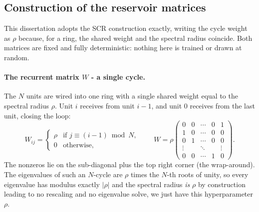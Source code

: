 \subsection{Construction of the reservoir matrices}
\label{sec:bg-scr-construction}

This dissertation adopts the SCR construction exactly, writing the cycle
weight as $\rho$ because, for a ring, the shared weight and the spectral
radius coincide. Both matrices are fixed and fully deterministic: nothing here
is trained or drawn at random.

\paragraph{The recurrent matrix $W$ -  a single cycle.}
The $N$ units are wired into one ring with a single shared weight equal to the spectral radius $\rho$. Unit $i$ receives from unit $i-1$, and unit $0$ receives from the last unit, closing the loop:
\begin{equation}
  W_{ij} =
  \begin{cases}
    \rho & \text{if } j \equiv (i-1) \bmod N,\\
    0    & \text{otherwise,}
  \end{cases}
  \qquad
  W = \rho
  \begin{pmatrix}
    0 & 0 & \cdots & 0 & 1\\
    1 & 0 & \cdots & 0 & 0\\
    0 & 1 & \cdots & 0 & 0\\
    \vdots & & \ddots & & \vdots\\
    0 & 0 & \cdots & 1 & 0
  \end{pmatrix}.
  \label{eq:scr-recurrent}
\end{equation}
The nonzeros lie on the sub-diagonal plus the top right corner (the wrap-around). The eigenvalues of such an $N$-cycle are $\rho$ times the $N$-th roots of unity, so every eigenvalue has modulus exactly $|\rho|$ and the spectral radius \emph{is} $\rho$ by construction leading to no rescaling and no eigenvalue solve, we just have this hyperparameter $\rho$.

